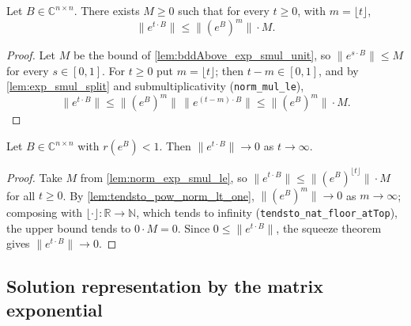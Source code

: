 \begin{lemma}
    \label{lem:norm_exp_smul_le}
    \leanok
    Let $B \in \mathbb{C}^{n \times n}$. There exists $M \ge 0$ such that for
    every $t \ge 0$, with $m = \lfloor t \rfloor$,
    \[ \|e^{t \cdot B}\| \le \|(e^{B})^{m}\| \cdot M. \]
\end{lemma}
\begin{proof}
    Let $M$ be the bound of \cref{lem:bddAbove_exp_smul_unit}, so $\|e^{s \cdot
    B}\| \le M$ for every $s \in [0,1]$. For $t \ge 0$ put $m = \lfloor t
    \rfloor$; then $t - m \in [0,1]$, and by \cref{lem:exp_smul_split} and
    submultiplicativity (\texttt{norm\_mul\_le}),
    \[ \|e^{t \cdot B}\| \le \|(e^{B})^{m}\| \, \|e^{(t-m) \cdot B}\| \le
       \|(e^{B})^{m}\| \cdot M. \]
\end{proof}

\begin{lemma}
    \label{lem:norm_exp_smul_tendsto_zero}
    \leanok
    Let $B \in \mathbb{C}^{n \times n}$ with $r(e^{B}) < 1$. Then $\|e^{t \cdot
    B}\| \to 0$ as $t \to \infty$.
\end{lemma}
\begin{proof}
    Take $M$ from \cref{lem:norm_exp_smul_le}, so $\|e^{t \cdot B}\| \le
    \|(e^{B})^{\lfloor t \rfloor}\| \cdot M$ for all $t \ge 0$. By
    \cref{lem:tendsto_pow_norm_lt_one}, $\|(e^{B})^{m}\| \to 0$ as $m \to
    \infty$; composing with $\lfloor \cdot \rfloor \colon \mathbb{R} \to
    \mathbb{N}$, which tends to infinity (\texttt{tendsto\_nat\_floor\_atTop}),
    the upper bound tends to $0 \cdot M = 0$. Since $0 \le \|e^{t \cdot B}\|$, the
    squeeze theorem gives $\|e^{t \cdot B}\| \to 0$.
\end{proof}

\subsection{Solution representation by the matrix exponential}

